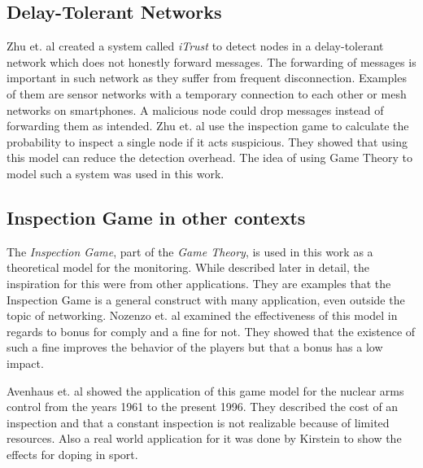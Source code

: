 \documentclass[thesis.tex]{subfiles}
\begin{document}
\subsection{Delay-Tolerant Networks}
Zhu et. al \cite{Zhu.2014} created a system called \textit{iTrust} to detect nodes in a delay-tolerant network which does not honestly forward messages. The forwarding of messages is important in such network as they suffer from frequent disconnection. Examples of them are sensor networks with a temporary connection to each other or mesh networks on smartphones. A malicious node could drop messages instead of forwarding them as intended. Zhu et. al use the inspection game to calculate the probability to inspect a single node if it acts suspicious. They showed that using this model can reduce the detection overhead. The idea of using Game Theory to model such a system was used in this work.

\subsection{Inspection Game in other contexts}
The \textit{Inspection Game}, part of the \textit{Game Theory}, is used in this work as a theoretical model for the monitoring. While described later in detail, the inspiration for this were from other applications. They are examples that the Inspection Game is a general construct with many application, even outside the topic of networking. Nozenzo et. al \cite{Nosenzo.2014} examined the effectiveness of this model in regards to bonus for comply and a fine for not. They showed that the existence of such a fine improves the behavior of the players but that a bonus has a low impact. 

Avenhaus et. al \cite{Avenhaus.1996} showed the application of this game model for the nuclear arms control from the years 1961 to the present 1996. They described the cost of an inspection and that a constant inspection is not realizable because of limited resources. Also a real world application for it was done by Kirstein \cite{RolandKirstein.2009} to show the effects for doping in sport.

\subfilebib %
\end{document}
